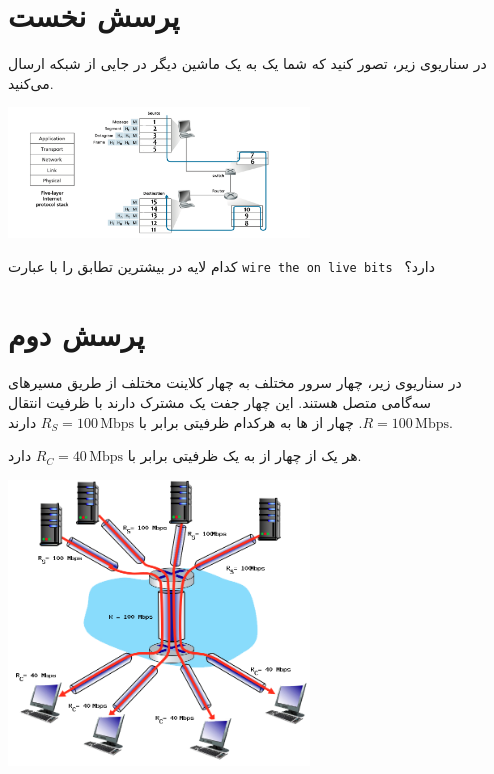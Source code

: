 \section*{پرسش نخست}

در سناریوی زیر، تصور کنید که شما یک به یک ماشین دیگر در جایی از شبکه ارسال می‌کنید.  
\begin{center}
\includegraphics[width=0.6\textwidth]{images/image1.png}
\end{center}



کدام لایه در  بیشترین تطابق را با عبارت \verb|wire the on live bits | دارد؟

\section*{پرسش دوم}
در سناریوی زیر، چهار سرور مختلف به چهار کلاینت مختلف از طریق مسیرهای سه‌گامی متصل هستند.  
این چهار جفت یک  مشترک دارند با ظرفیت انتقال \(R = 100 \, \text{Mbps}\).  
چهار  از ها به  هرکدام ظرفیتی برابر با \(R_S = 100 \, \text{Mbps}\) دارند.  


هر یک از چهار  از  به یک  ظرفیتی برابر با \(R_C = 40 \, \text{Mbps}\) دارد.  

\begin{center}
\includegraphics[width=0.6\textwidth]{images/image2.png}
\end{center}





